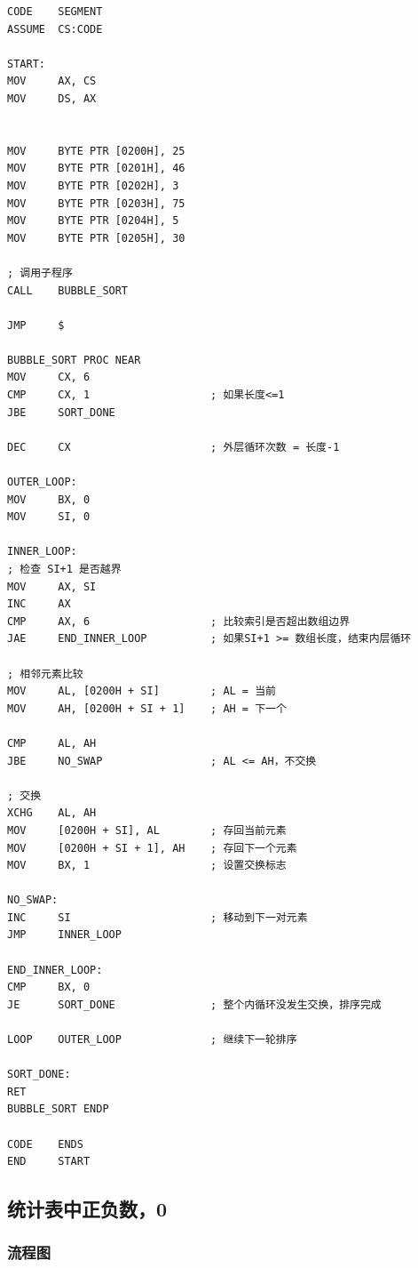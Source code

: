 \documentclass[UTF8]{article}
\begin{document}
\begin{lstlisting}[language={[x86masm]Assembler}]
CODE    SEGMENT
ASSUME  CS:CODE

START:
MOV     AX, CS
MOV     DS, AX


MOV     BYTE PTR [0200H], 25
MOV     BYTE PTR [0201H], 46
MOV     BYTE PTR [0202H], 3
MOV     BYTE PTR [0203H], 75
MOV     BYTE PTR [0204H], 5
MOV     BYTE PTR [0205H], 30

; 调用子程序
CALL    BUBBLE_SORT

JMP     $

BUBBLE_SORT PROC NEAR
MOV     CX, 6                   
CMP     CX, 1                   ; 如果长度<=1
JBE     SORT_DONE

DEC     CX                      ; 外层循环次数 = 长度-1

OUTER_LOOP:
MOV     BX, 0                   
MOV     SI, 0                   

INNER_LOOP:
; 检查 SI+1 是否越界
MOV     AX, SI
INC     AX
CMP     AX, 6                   ; 比较索引是否超出数组边界
JAE     END_INNER_LOOP          ; 如果SI+1 >= 数组长度，结束内层循环

; 相邻元素比较
MOV     AL, [0200H + SI]        ; AL = 当前
MOV     AH, [0200H + SI + 1]    ; AH = 下一个

CMP     AL, AH
JBE     NO_SWAP                 ; AL <= AH，不交换

; 交换
XCHG    AL, AH
MOV     [0200H + SI], AL        ; 存回当前元素
MOV     [0200H + SI + 1], AH    ; 存回下一个元素
MOV     BX, 1                   ; 设置交换标志

NO_SWAP:
INC     SI                      ; 移动到下一对元素
JMP     INNER_LOOP

END_INNER_LOOP:
CMP     BX, 0
JE      SORT_DONE               ; 整个内循环没发生交换，排序完成

LOOP    OUTER_LOOP              ; 继续下一轮排序

SORT_DONE:
RET
BUBBLE_SORT ENDP

CODE    ENDS
END     START
\end{lstlisting}

\subsection{统计表中正负数，0}

\subsubsection{流程图}
\end{document}
